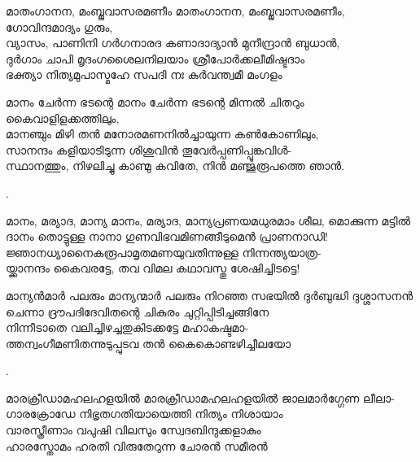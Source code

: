 \begin{enumerate}


\begin{slokam}{\VSv}{\KT}{മാതംഗാനന, മംബ്ജവാസരമണീം}
മാതംഗാനന, മംബ്ജവാസരമണീം, ഗോവിന്ദമാദ്യം ഗുരും,\\
വ്യാസം, പാണിനി ഗർഗനാരദ കണാദാദ്യാൻ മുനീന്ദ്രാൻ ബുധാൻ,\\
ദുർഗാം ചാപി മൃദംഗശൈലനിലയാം ശ്രീപോർക്കലീമിഷ്ടദാം\\
ഭക്ത്യാ നിത്യമുപാസ്മഹേ സപദി നഃ കുർവന്ത്വമീ മംഗളം
\end{slokam}


\begin{slokam}{\VSv}{\VNM}{മാനം ചേർന്ന ഭടന്റെ}
മാനം ചേർന്ന ഭടന്റെ മിന്നൽ ചിതറും കൈവാളിളക്കത്തിലും,\\
മാനഞ്ചും മിഴി തൻ മനോരമണനിൽച്ചായുന്ന കൺകോണിലും,\\
സാനന്ദം കളിയാടിടുന്ന ശിശുവിൻ തൂവേർപ്പണിപ്പൂങ്കവിള്‍-\\
സ്ഥാനത്തും, നിഴലിച്ചു കാണ്മു കവിതേ, നിൻ മഞ്ജുരൂപത്തെ ഞാൻ.
\end{slokam}


.

\begin{slokam}{\VSr}{\VCBP}{മാനം, മര്യാദ, മാന്യ}
മാനം, മര്യാദ, മാന്യപ്രണയമധുരമാം ശീല, മൊക്കുന്ന മട്ടിൽ\\
ദാനം തൊട്ടുള്ള നാനാ ഗുണവിഭവമിണങ്ങീടുമെൻ പ്രാണനാഡി!\\
ജ്ഞാനധ്യാനൈകരൂപാമൃതമണയുവതിന്നുള്ള നിന്നന്ത്യയാത്ര-\\
യ്ക്കാനന്ദം കൈവരട്ടേ, തവ വിമല കഥാവസ്തു ശേഷിച്ചിടട്ടെ!
\end{slokam}



\begin{slokam}{\VSv}{\Naduv}{മാന്യൻമാർ പലരും}
മാന്യന്മാർ പലരും നിറഞ്ഞ സഭയിൽ ദുർബുദ്ധി ദുശ്ശാസനൻ\\
ചെന്നാ ദ്രൗപദിദേവിതന്റെ ചികുരം ചുറ്റിപ്പിടിച്ചങ്ങിനേ\\
നിന്നീടാതെ വലിച്ചിഴച്ചതുകിടക്കട്ടേ മഹാകഷ്ടമാ-\\
ത്തന്വംഗീമണിതന്നുടുപ്പുടവ തൻ കൈകൊണ്ടഴിച്ചീലയോ
\end{slokam}


.


\begin{slokam}{\VMk}{\KV}{മാരക്രീഡാമഹലഹളയിൽ}
മാരക്രീഡാമഹലഹളയിൽ ജാലമാർഗ്ഗേണ ലീലാ-\\
ഗാരക്രോഡേ നിഭൃതഗതിയായെത്തി നിത്യം നിശായാം\\
വാരസ്ത്രീണാം വപു‍ഷി വിലസും സ്വേദബിന്ദുക്കളാകും\\
ഹാരസ്തോമം ഹരതി വിരുതേറുന്ന ചോരൻ സമീരൻ
\end{slokam}


\end{enumerate}
